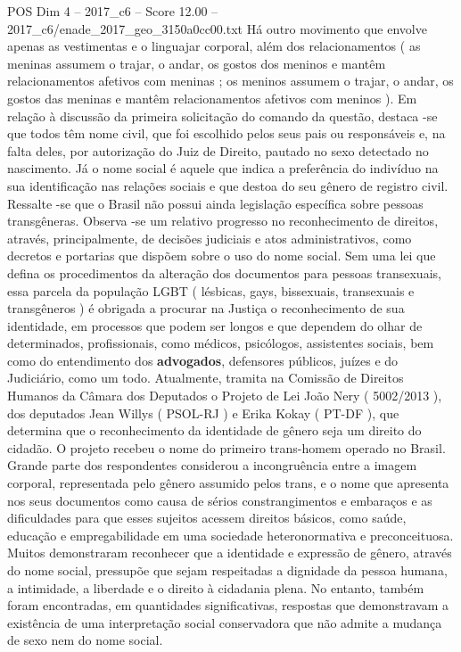 \begin{textsample}{POS Dim 4 – 2017\_c6 – Score 12.00 – 2017\_c6/enade\_2017\_geo\_3150a0cc00.txt}
Há outro movimento que envolve apenas as vestimentas e o linguajar corporal, além dos relacionamentos ( as meninas assumem o trajar, o andar, os gostos dos meninos e mantêm relacionamentos afetivos com meninas ; os meninos assumem o trajar, o andar, os gostos das meninas e mantêm relacionamentos afetivos com meninos ).
Em relação à discussão da primeira solicitação do comando da questão, destaca -se que todos têm nome civil, que foi escolhido pelos seus pais ou responsáveis e, na falta deles, por autorização do Juiz de Direito, pautado no sexo detectado no nascimento.
Já o nome social é aquele que indica a preferência do indivíduo na sua identificação nas relações sociais e que destoa do seu gênero de registro civil.
Ressalte -se que o Brasil não possui ainda legislação específica sobre pessoas transgêneras.
Observa -se um relativo progresso no reconhecimento de direitos, através, principalmente, de decisões judiciais e atos administrativos, como decretos e portarias que dispõem sobre o uso do nome social.
Sem uma lei que defina os procedimentos da alteração dos documentos para pessoas transexuais, essa parcela da população LGBT ( lésbicas, gays, bissexuais, transexuais e transgêneros ) é obrigada a procurar na Justiça o reconhecimento de sua identidade, em processos que podem ser longos e que dependem do olhar de determinados, profissionais, como médicos, psicólogos, assistentes sociais, bem como do entendimento dos \textbf{advogados}, defensores públicos, juízes e do Judiciário, como um todo.
Atualmente, tramita na Comissão de Direitos Humanos da Câmara dos Deputados o Projeto de Lei João Nery ( 5002/2013 ), dos deputados Jean Willys ( PSOL-RJ ) e Erika Kokay ( PT-DF ), que determina que o reconhecimento da identidade de gênero seja um direito do cidadão.
O projeto recebeu o nome do primeiro trans-homem operado no Brasil.
Grande parte dos respondentes considerou a incongruência entre a imagem corporal, representada pelo gênero assumido pelos trans, e o nome que apresenta nos seus documentos como causa de sérios constrangimentos e embaraços e as dificuldades para que esses sujeitos acessem direitos básicos, como saúde, educação e empregabilidade em uma sociedade heteronormativa e preconceituosa.
Muitos demonstraram reconhecer que a identidade e expressão de gênero, através do nome social, pressupõe que sejam respeitadas a dignidade da pessoa humana, a intimidade, a liberdade e o direito à cidadania plena.
No entanto, também foram encontradas, em quantidades significativas, respostas que demonstravam a existência de uma interpretação social conservadora que não admite a mudança de sexo nem do nome social.

\end{textsample}
